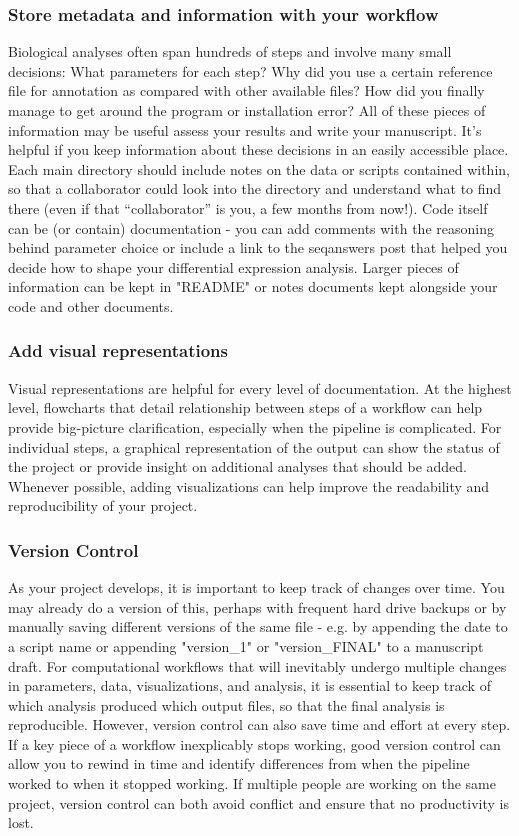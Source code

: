 \documentclass[10pt,letterpaper]{article}
\begin{document}
\subsubsection*{Store metadata and information with your workflow} 
Biological analyses often span hundreds of steps and involve many small decisions: What parameters for each step? Why did you use a certain reference file for annotation as compared with other available files? How did you finally manage to get around the program or installation error? All of these pieces of information may be useful assess your results and write your manuscript. It's helpful if you keep information about these decisions in an easily accessible place. Each main directory should include notes on the data or scripts contained within, so that a collaborator could look into the directory and understand what to find there (even if that “collaborator” is you, a few months from now!). Code itself can be (or contain) documentation - you can add comments with the reasoning behind parameter choice or include a link to the seqanswers post that helped you decide how to shape your differential expression analysis. Larger pieces of information can be kept in "README" or notes documents kept alongside your code and other documents. 

\subsubsection*{Add visual representations} Visual representations are helpful for every level of documentation. At the highest level, flowcharts that detail relationship between steps of a workflow can help provide big-picture clarification, especially when the pipeline is complicated. For individual steps, a graphical representation of the output can show the status of the project or provide insight on additional analyses that should be added. Whenever possible, adding visualizations can help improve the readability and reproducibility of your project.

\subsubsection*{Version Control} As your project develops, it is important to keep track of changes over time. You may already do a version of this, perhaps with frequent hard drive backups or by manually saving different versions of the same file  - e.g. by appending the date to a script name or appending "version\_1" or "version\_FINAL" to a manuscript draft. For computational workflows that will inevitably undergo multiple changes in parameters, data, visualizations, and analysis, it is essential to keep track of which analysis produced which output files, so that the final analysis is reproducible. However, version control can also save time and effort at every step. If a key piece of a workflow inexplicably stops working, good version control can allow you to rewind in time and identify differences from when the pipeline worked to when it stopped working. If multiple people are working on the same project, version control can both avoid conflict and ensure that no productivity is lost. 
\end{document}
